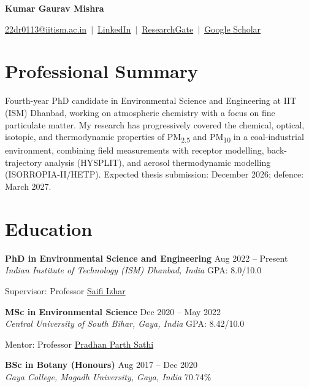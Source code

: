 \documentclass[11pt, a4paper]{article}
\newcommand{\entry}[4]{%
  \noindent\textbf{#1} \hfill #2 \\
  \textit{#3} \hfill #4 \par
  \vspace{0.3em}
}
\begin{document}
\begin{center}
{\Huge\textbf{Kumar Gaurav Mishra}}

\vspace{0.5em}
\href{mailto:22dr0113@iitism.ac.in}{22dr0113@iitism.ac.in} \,$\vert$\,
\href{https://www.linkedin.com/in/mkrgaurav/}{LinkedIn} \,$\vert$\,
\href{https://www.researchgate.net/profile/Kumar-Mishra-6}{ResearchGate} \,$\vert$\,
\href{https://scholar.google.co.in/citations?hl=en&user=PaZtUNUAAAAJ}{Google Scholar}
\end{center}

\section*{Professional Summary}
Fourth-year PhD candidate in Environmental Science and Engineering at IIT (ISM) Dhanbad, working on atmospheric chemistry with a focus on fine particulate matter. My research has progressively covered the chemical, optical, isotopic, and thermodynamic properties of PM\textsubscript{2.5} and PM\textsubscript{10} in a coal-industrial environment, combining field measurements with receptor modelling, back-trajectory analysis (HYSPLIT), and aerosol thermodynamic modelling (ISORROPIA-II/HETP). Expected thesis submission: December 2026; defence: March 2027.

\section*{Education}
\entry{PhD in Environmental Science and Engineering}{Aug 2022 -- Present}
{Indian Institute of Technology (ISM) Dhanbad, India}{GPA: 8.0/10.0}
\noindent Supervisor: Professor \href{https://scholar.google.co.in/citations?hl=en&user=nZfe14IAAAAJ}{Saifi Izhar}

\vspace{0.3em}
\entry{MSc in Environmental Science}{Dec 2020 -- May 2022}
{Central University of South Bihar, Gaya, India}{GPA: 8.42/10.0}
\noindent Mentor: Professor \href{https://scholar.google.co.in/citations?user=HTRBrykAAAAJ&hl=en&oi=ao}{Pradhan Parth Sathi}

\vspace{0.3em}
\entry{BSc in Botany (Honours)}{Aug 2017 -- Dec 2020}
{Gaya College, Magadh University, Gaya, India}{70.74\%}
\end{document}
